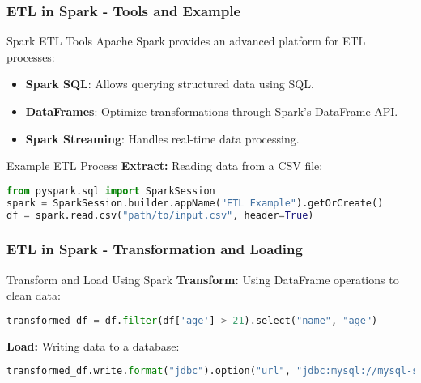 \documentclass[aspectratio=169]{beamer}
\begin{document}
\begin{frame}[fragile]
    \frametitle{ETL in Spark - Tools and Example}
    \begin{block}{Spark ETL Tools}
        Apache Spark provides an advanced platform for ETL processes:
        \begin{itemize}
            \item \textbf{Spark SQL}: Allows querying structured data using SQL.
            \item \textbf{DataFrames}: Optimize transformations through Spark's DataFrame API.
            \item \textbf{Spark Streaming}: Handles real-time data processing.
        \end{itemize}
    \end{block}
    \begin{block}{Example ETL Process}
        \textbf{Extract:} Reading data from a CSV file:
        \begin{lstlisting}[language=python]
from pyspark.sql import SparkSession
spark = SparkSession.builder.appName("ETL Example").getOrCreate()
df = spark.read.csv("path/to/input.csv", header=True)
        \end{lstlisting}
    \end{block}
\end{frame}

\begin{frame}[fragile]
    \frametitle{ETL in Spark - Transformation and Loading}
    \begin{block}{Transform and Load Using Spark}
        \textbf{Transform:} Using DataFrame operations to clean data:
        \begin{lstlisting}[language=python]
transformed_df = df.filter(df['age'] > 21).select("name", "age")
        \end{lstlisting}
        
        \textbf{Load:} Writing data to a database:
        \begin{lstlisting}[language=python]
transformed_df.write.format("jdbc").option("url", "jdbc:mysql://mysql-server/db").option("dbtable", "transformed_table").option("user", "user").option("password", "pass").save()
        \end{lstlisting}
    \end{block}
\end{frame}
\end{document}
